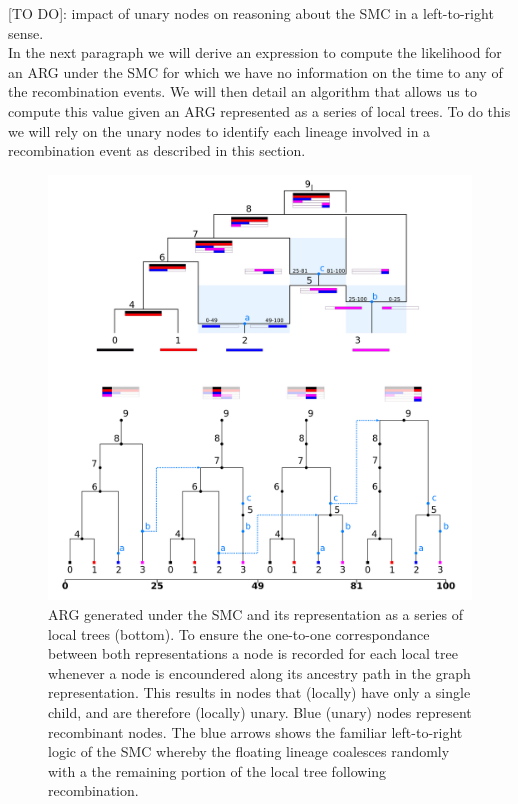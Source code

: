 \documentclass{article}
\begin{document}
[TO DO]: impact of unary nodes on reasoning about the SMC in a left-to-right sense.\\

In the next paragraph we will derive an expression to compute the 
likelihood for an ARG under the SMC for which we have no information on the 
time to any of the recombination events. We will then detail an algorithm 
that allows us to compute this value given an ARG 
represented as a series of local trees. To do this we will rely on the unary nodes 
to identify each lineage involved in a recombination event 
as described in this section.


\begin{figure}[!ht]
\centering
\includegraphics[width=\textwidth]{figures/smc_custom_2rows_area.png}
\caption{ARG generated under the SMC and its representation as a 
series of local trees (bottom). To ensure the one-to-one correspondance 
between both representations a node is recorded for each local tree whenever 
a node is encoundered along its ancestry path in the graph representation. 
This results in nodes that (locally) have only a single child, and are therefore 
(locally) unary. Blue (unary) nodes represent recombinant nodes. 
The blue arrows shows the familiar left-to-right logic of the SMC whereby 
the floating lineage coalesces randomly
with a the remaining portion of the local tree following recombination.
}
\end{figure}
\end{document}
